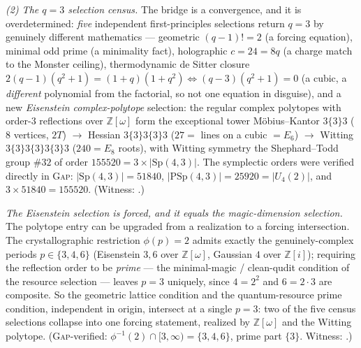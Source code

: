 \documentclass[11pt]{article}
\begin{document}
\emph{(2) The $q=3$ selection census.} The bridge is a convergence, and it is
overdetermined: \emph{five} independent first-principles selections return $q=3$
by genuinely different mathematics --- geometric $(q-1)!=2$ (a forcing equation),
minimal odd prime (a minimality fact), holographic $c=24=8q$ (a charge match to
the Monster ceiling), thermodynamic de Sitter closure
$2(q-1)(q^2+1)=(1+q)(1+q^2)\Leftrightarrow(q-3)(q^2+1)=0$ (a cubic, a
\emph{different} polynomial from the factorial, so not one equation in disguise),
and a new \emph{Eisenstein complex-polytope} selection: the regular complex
polytopes with order-$3$ reflections over $\mathbb Z[\omega]$ form the exceptional
tower M\"obius--Kantor $3\{3\}3$ ($8$ vertices, $2T$) $\to$ Hessian
$3\{3\}3\{3\}3$ ($27=$ lines on a cubic $=E_6$) $\to$ Witting
$3\{3\}3\{3\}3\{3\}3$ ($240=E_8$ roots), with Witting symmetry the
Shephard--Todd group $\#32$ of order $155520=3\times|\mathrm{Sp}(4,3)|$. The
symplectic orders were verified directly in \textsc{Gap}:
$|\mathrm{Sp}(4,3)|=51840$, $|\mathrm{PSp}(4,3)|=25920=|U_4(2)|$, and
$3\times51840=155520$. (Witness: .)

\emph{The Eisenstein selection is forced, and it equals the magic-dimension
selection.} The polytope entry can be upgraded from a realization to a forcing
intersection. The crystallographic restriction $\phi(p)=2$ admits exactly the
genuinely-complex periods $p\in\{3,4,6\}$ (Eisenstein $3,6$ over $\mathbb Z[\omega]$,
Gaussian $4$ over $\mathbb Z[i]$); requiring the reflection order to be \emph{prime}
--- the minimal-magic / clean-qudit condition of the resource selection --- leaves
$p=3$ uniquely, since $4=2^2$ and $6=2\cdot3$ are composite. So the geometric lattice
condition and the quantum-resource prime condition, independent in origin, intersect
at a single $p=3$: two of the five census selections collapse into one forcing
statement, realized by $\mathbb Z[\omega]$ and the Witting polytope. (\textsc{Gap}-verified:
$\phi^{-1}(2)\cap[3,\infty)=\{3,4,6\}$, prime part $\{3\}$. Witness:
.)
\end{document}
